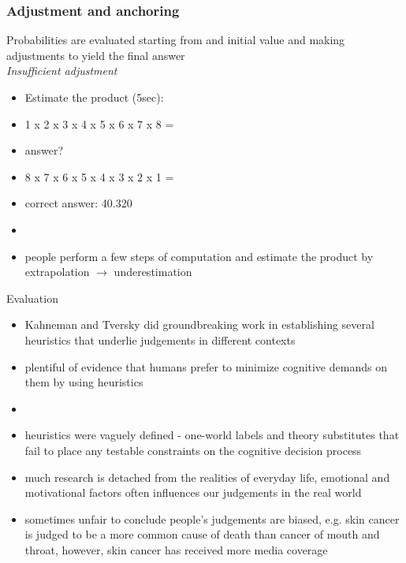 \documentclass[]{beamer}
\begin{document}
\begin{frame}
 \frametitle{Adjustment and anchoring}
\begin{overlayarea}{120mm}{70mm}
 Probabilities are evaluated starting from and initial value and making adjustments to yield the final answer\\ \vspace{3mm}
\textit{Insufficient adjustment} 
\begin{itemize}
 \item Estimate the product (5sec): 
 \item<2,6-> 1 x 2 x 3 x 4 x 5 x 6 x 7 x 8 = 
 \item<3,5> answer? 
 \item<4,6-> 8 x 7 x 6 x 5 x 4 x 3 x 2 x 1 = 
 \item<7-> correct answer: 40.320
 \item[]
 \item<8-> people perform a few steps of computation and estimate the product by extrapolation $\rightarrow$ underestimation
\end{itemize}
\end{overlayarea}
\end{frame}

\begin{frame}{Evaluation}
 \begin{overlayarea}{120mm}{80mm}
  
\begin{itemize}
 \item Kahneman and Tversky did groundbreaking work in establishing several heuristics that underlie judgements in different contexts
 \item plentiful of evidence that humans prefer to minimize cognitive demands on them by using heuristics
 \item[]
 \item<2->[!] heuristics were vaguely defined - one-world labels and theory substitutes that fail to place any testable constraints on the cognitive decision process
 \item<3->[!] much research is detached from the realities of everyday life, emotional and motivational factors often influences our judgements in the real world
 \item<4->[!] sometimes unfair to conclude people's judgements are biased, e.g. skin cancer is judged to be a more common cause of death than cancer of mouth and throat, however, skin cancer has received more media coverage 
 \end{itemize}
\end{overlayarea}
\end{frame}
\end{document}
